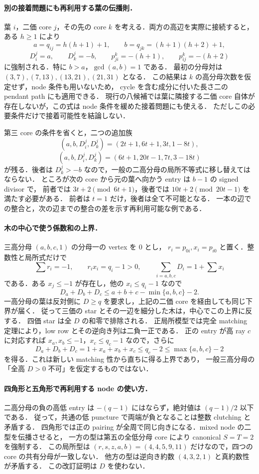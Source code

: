\paragraph{別の接着問題にも再利用する葉の伝播則．}
葉 $i$，二価 core $j$，その先の core $k$ を考える．両方の高辺を実際に接続すると，
ある $h\geq1$ により
\[
 a=q_{ij}=h(h+1)+1,\qquad b=q_{jk}=(h+1)(h+2)+1,
\]
\[
 D^j_i=a,\qquad D^j_k=-b,\qquad
 p^k_{ji}=-(h+1),\qquad p^k_{ij}=-(h+2)
\]
に強制される．特に $b>a$，$\gcd(a,b)=1$ である．
最初の分母対は $(3,7),(7,13),(13,21),(21,31)$ となる．
この結果は $k$ の高分母次数を仮定せず，node 条件も用いないため，
cycle を含む成分に付いた長さ二の pendant path にも適用できる．
現行の八候補では葉に隣接する二価 core 自体が存在しないが，この式は node 条件を緩めた接着問題にも使える．
ただしこの必要条件だけで接着可能性を結論しない．

第三 core の条件を省くと，二つの追加族
\[
 (a,b,D^j_i,D^j_k)=(2t+1,6t+1,3t,1-8t),
\]
\[
 (a,b,D^j_i,D^j_k)=(6t+1,20t-1,7t,3-18t)
\]
が残る．後者は $D^j_k>-b$ なので，一般の二高分母の局所不等式に移し替えてはならない．
ところが次の core から元の葉へ向かう entry は $b-1$ の signed divisor で，
前者では $3t+2\pmod{6t+1}$，後者では $10t+2\pmod{20t-1}$ を満たす必要がある．
前者は $t=1$ だけ，後者は全て不可能となる．
一本の辺での整合と，次の辺までの整合の差を示す再利用可能な例である．

\paragraph{木の中心で使う係数和の上界．}
三高分母 $(a,b,c,1)$ の分母一の vertex を $0$ とし，
$r_i=p_{0i},x_i=p_{i0}$ と置く．整数性と局所式だけで
\[
 \sum r_i=-1,\qquad r_ix_i=q_i-1>0,\qquad
 \sum_{i=a,b,c}D_i=1+\sum x_i
\]
である．ある $x_j\leq-1$ が存在し，他の $x_i\leq q_i-1$ なので
\[
 D_a+D_b+D_c\leq a+b+c-\min\{a,b,c\}-2.
\]
一高分母の葉は反対側に $D\geq q$ を要求し，上記の二価 core を経由しても同じ下界が届く．
従って三価の star とその一辺を細分した木は，中心でこの上界に反する．
四価 star は全 $D$ の和零で排除される．
正局所模型では完全 matching 定理により，low row とその逆向き列は二負一正である．
正の entry が高 ray $c$ に対応すれば $x_a,x_b\le-1$，$x_c\le q_c-1$ なので，さらに
\[
 D_a+D_b+D_c=1+x_a+x_b+x_c\le q_c-2\le\max\{a,b,c\}-2
\]
を得る．これは新しい matching 性から直ちに得る上界であり，
一般三高分母の「全高 $D>0$ 不可」を仮定するものではない．

\paragraph{四角形と五角形で再利用する node の使い方．}
二高分母の負の高低 entry は $-(q-1)$ にはならず，絶対値は $(q-1)/2$ 以下である．
従って，共通の低 puncture で両端が負となることは整数 clutching と矛盾する．
四角形では正の pairing が全周で同じ向きになる．mixed node の二型を伝播させると，
一方の型は第五の全低分母 core により canonical $S=T=2$ を強制する．
この局所型は $(r,s,z,a,b)=(4,4,5,9,11)$ だけなので，四つの core の共有分母が一致しない．
他方の型は逆向き約数 $(4,3,2,1)$ と真約数性が矛盾する．
この改訂証明は $D$ を使わない．

